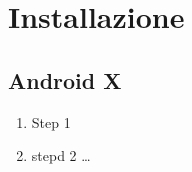 \documentclass[../ClipsManualeUtente.tex]{subfiles}
\begin{document}
\section{Installazione}

	\subsection{Android X}
		
		\begin{enumerate}
			\item Step 1
			\item stepd 2 \dots
		\end{enumerate}
\end{document}
